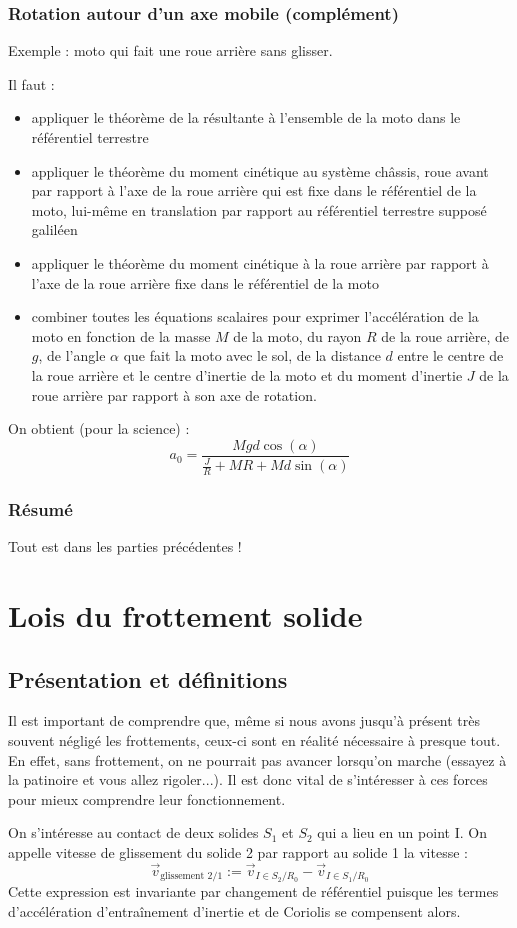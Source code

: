 \documentclass[french]{book}
\theoremstyle{plain}
\theoremstyle{definition}
\theoremstyle{remark}
\begin{document}
\subsection{Rotation autour d'un axe mobile (complément)}
Exemple : moto qui fait une roue arrière sans glisser. \\ \par Il faut : \begin{itemize}
	\item appliquer le théorème de la résultante à l'ensemble de la moto dans le référentiel terrestre
	\item appliquer le théorème du moment cinétique au système {châssis, roue avant} par rapport à l'axe de la roue arrière qui est fixe dans le référentiel de la moto, lui-même en translation par rapport au référentiel terrestre supposé galiléen
	\item appliquer le théorème du moment cinétique à la roue arrière par rapport à l'axe de la roue arrière fixe dans le référentiel de la moto
	\item combiner toutes les équations scalaires pour exprimer l'accélération de la moto en fonction de la masse $M$ de la moto, du rayon $R$ de la roue arrière, de $g$, de l'angle $\alpha$ que fait la moto avec le sol, de la distance $d$ entre le centre de la roue arrière et le centre d'inertie de la moto et du moment d'inertie $J$ de la roue arrière par rapport à son axe de rotation.
\end{itemize} On obtient (pour la science) : $$a_0=\frac{Mgd\cos(\alpha)}{\displaystyle\frac{J}{R}+MR+Md\sin(\alpha)}$$
\subsection{Résumé}
Tout est dans les parties précédentes !

\chapter{Lois du frottement solide}
\localtableofcontents
\section{Présentation et définitions}
Il est important de comprendre que, même si nous avons jusqu'à présent très souvent négligé les frottements, ceux-ci sont en réalité nécessaire à presque tout. En effet, sans frottement, on ne pourrait pas avancer lorsqu'on marche (essayez à la patinoire et vous allez rigoler...). Il est donc vital de s'intéresser à ces forces pour mieux comprendre leur fonctionnement. \\ \par
On s'intéresse au contact de deux solides $S_1$ et $S_2$ qui a lieu en un point I. On appelle vitesse de glissement du solide 2 par rapport au solide 1 la vitesse : $$\overrightarrow{v}_{\text{glissement }2/1}:=\overrightarrow{v}_{I\in S_2/R_0}-\overrightarrow{v}_{I\in S_1/R_0}$$
Cette expression est invariante par changement de référentiel puisque les termes d'accélération d'entraînement d'inertie et de Coriolis se compensent alors.
\end{document}
